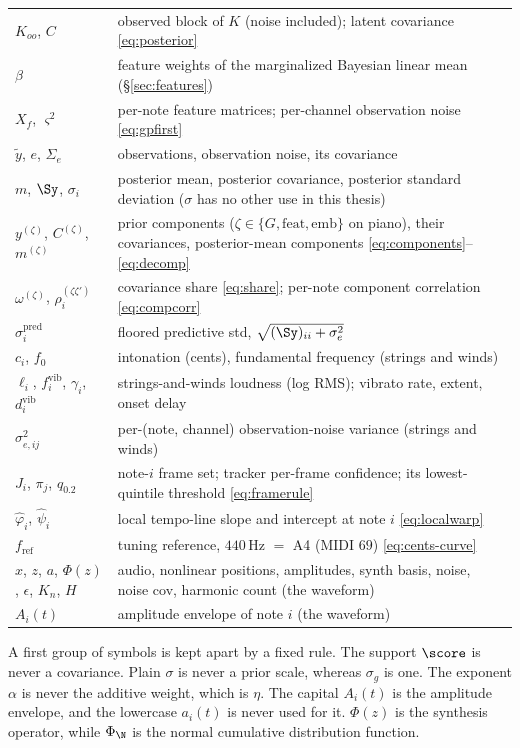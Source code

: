 \begin{center}
\begin{longtable}{@{}p{4.3cm}p{9.2cm}@{}}
$K_{oo}$, $C$ & observed block of $K$ (noise included); latent covariance \eqref{eq:posterior} \\
$\beta$ & feature weights of the marginalized Bayesian linear mean (\S\ref{sec:features}) \\
$X_f$, $\varsigma^2$ & per-note feature matrices; per-channel observation noise \eqref{eq:gpfirst} \\
$\tilde y$, $e$, $\Sigma_e$ & observations, observation noise, its covariance \\
$m$, $\Sy$, $\sigma_i$ & posterior mean, posterior covariance, posterior standard deviation ($\sigma$ has no other use in this thesis) \\
$y^{(\zeta)}$, $C^{(\zeta)}$, $m^{(\zeta)}$ & prior components ($\zeta \in \{G, \mathrm{feat}, \mathrm{emb}\}$ on piano), their covariances, posterior-mean components \eqref{eq:components}--\eqref{eq:decomp} \\
$\omega^{(\zeta)}$, $\rho^{(\zeta\zeta')}_i$ & covariance share \eqref{eq:share}; per-note component correlation \eqref{eq:compcorr} \\
$\sigma_i^{\mathrm{pred}}$ & floored predictive std, $\sqrt{(\Sy)_{ii} + \sigma_e^2}$ \\
$c_i$, $f_0$ & intonation (cents), fundamental frequency (strings and winds) \\
$\ell_i$, $f_i^{\mathrm{vib}}$, $\gamma_i$, $d_i^{\mathrm{vib}}$ & strings-and-winds loudness (log RMS); vibrato rate, extent, onset delay \\
$\sigma_{e,ij}^2$ & per-(note, channel) observation-noise variance (strings and winds) \\
$J_i$, $\pi_j$, $q_{0.2}$ & note-$i$ frame set; tracker per-frame confidence; its lowest-quintile threshold \eqref{eq:framerule} \\
$\hat\varphi_i$, $\hat\psi_i$ & local tempo-line slope and intercept at note $i$ \eqref{eq:localwarp} \\
$f_{\mathrm{ref}}$ & tuning reference, $440$\,Hz $=$ A4 (MIDI $69$) \eqref{eq:cents-curve} \\
$x$, $z$, $a$, $\Phi(z)$, $\epsilon$, $K_n$, $H$ & audio, nonlinear positions, amplitudes, synth basis, noise, noise cov, harmonic count (the waveform) \\
$A_i(t)$ & amplitude envelope of note $i$ (the waveform) \\
\end{longtable}
\end{center}
\noindent A first group of symbols is kept apart by a fixed rule. The
support $\score$ is never a covariance. Plain $\sigma$ is never a prior
scale, whereas $\sigma_g$ is one. The exponent $\alpha$ is never the
additive weight, which is $\eta$. The capital $A_i(t)$ is the amplitude
envelope, and the lowercase $a_i(t)$ is never used for it. $\Phi(z)$ is the
synthesis operator, while $\Phi_{\N}$ is the normal cumulative distribution
function.

